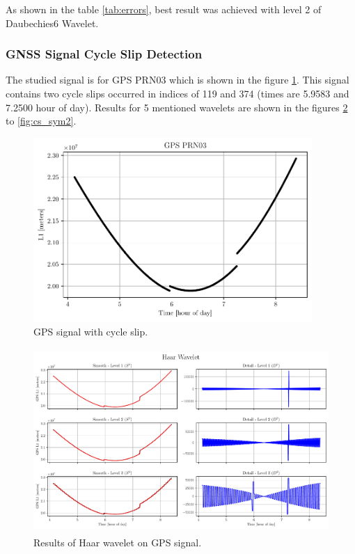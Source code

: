 \documentclass[12pt]{article}
\begin{document}
	As shown in the table \ref{tab:errors}, best result was achieved with level 2 of Daubechies6 Wavelet.
	
	\subsubsection{GNSS Signal Cycle Slip Detection}
	
	The studied signal is for GPS PRN03 which is shown in the figure \ref{fig:GPS_Signal}. This signal contains two cycle slips occurred in indices of 119 and 374 (times are 5.9583 and 7.2500 hour of day). Results for 5 mentioned wavelets are shown in the figures \ref{fig:cs_haar} to \ref{fig:cs_sym2}. 
	
	\begin{figure}[!h]
		\centering
		\includegraphics[height=7cm]{../Tests/Outputs/CycleSlip_MainSignal.pdf}
		\caption{GPS signal with cycle slip.}
		\label{fig:GPS_Signal}
	\end{figure}
	
	\begin{figure}[!h]
		\centering
		\includegraphics[height=7cm]{../Tests/Outputs/CycleSlip_Haar.pdf}
		\caption{Results of Haar wavelet on GPS signal.}
		\label{fig:cs_haar}
	\end{figure}
	
\end{document}
